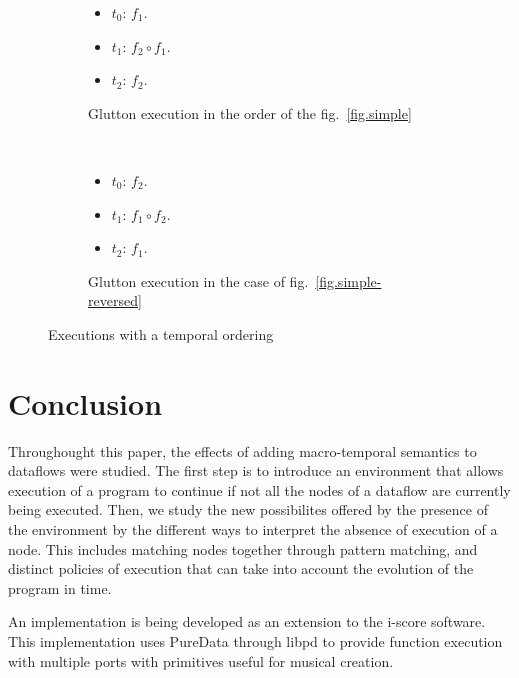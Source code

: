 \documentclass{article}
\begin{document}
\begin{figure}[h]
  \begin{subfigure}{0.20\textwidth}
    \begin{itemize}
      \item $t_0$: $f_1$.
      \item $t_1$: $f_2 \circ f_1$.
      \item $t_2$: $f_2$. 
    \end{itemize}
    \caption{Glutton execution in the order of the fig.~\ref{fig.simple}}
  \end{subfigure}~
  \begin{subfigure}{0.20\textwidth}
    \begin{itemize}
      \item $t_0$: $f_2$.
      \item $t_1$: $f_1 \circ f_2$.
      \item $t_2$: $f_1$. 
    \end{itemize}
    \caption{Glutton execution in the case of fig.~\ref{fig.simple-reversed}}
  \end{subfigure}
  \caption{Executions with a temporal ordering}
  \label{fig.temporalordering}
\end{figure}
    
    
    
\section{Conclusion}
Throughought this paper, the effects of adding macro-temporal semantics to dataflows were studied. 
The first step is to introduce an environment that allows execution of a program to continue if not all the nodes of a dataflow are currently being executed.
Then, we study the new possibilites offered by the presence of the environment by the different ways to interpret the absence of execution of a node.
This includes matching nodes together through pattern matching, and distinct policies of execution that can take into account the evolution of the program in time.

An implementation is being developed as an extension to the i-score software. 
This implementation uses PureData through libpd to provide function execution with multiple ports
with primitives useful for musical creation.

    
\printbibliography 
\end{document}
